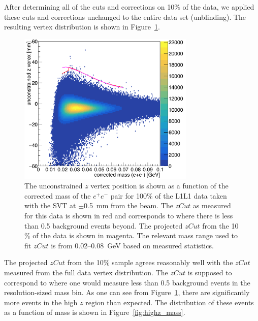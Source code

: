 After determining all of the cuts and corrections on 10$\%$ of the data, we applied these cuts and corrections unchanged to the entire data set (unblinding). The resulting vertex distribution is shown in Figure~\ref{fig:zVm_ub}.
\begin{figure}[htb]
  \centering
      \includegraphics[width=0.75\textwidth]{pics/results/zVm_ub_L1L1.png}
  \caption[Vertex position vs mass for the 100$\%$ L1L1 data at 0.5~mm]{The unconstrained $z$ vertex position is shown as a function of the corrected mass of the $e^+e^-$ pair for 100$\%$ of the L1L1 data taken with the SVT at $\pm$0.5~mm from the beam. The $zCut$ as measured for this data is shown in red and corresponds to where there is less than 0.5 background events beyond. The projected $zCut$ from the 10$\%$ of the data is shown in magenta. The relevant mass range used to fit $zCut$ is from 0.02--0.08~GeV based on measured statistics.}
  \label{fig:zVm_ub}
\end{figure} 
The projected $zCut$ from the 10$\%$ sample agrees reasonably well with the $zCut$ measured from the full data vertex distribution. The $zCut$ is supposed to correspond to where one would measure less than 0.5 background events in the resolution-sized mass bin. As one can see from Figure~\ref{fig:zVm_ub}, there are significantly more events in the high $z$ region than expected. The distribution of these events as a function of mass is shown in Figure~\ref{fig:highz_mass}.
